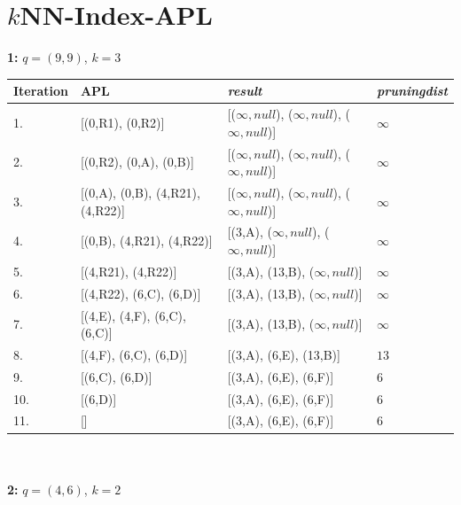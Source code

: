     \section{\(k\)NN-Index-APL}
    \textbf{1:} \(q=(9,9)\), \(k=3\)\\
    \begin{tabular}{l | l | l | l}
        Iteration   & APL               & \textit{result}                                               & \textit{pruningdist} \\
        \toprule
        1.          & [(0,R1), (0,R2)]   & [(\(\infty, null\)), (\(\infty, null\)), (\(\infty, null\))]  & \(\infty\) \\
        2.          & [(0,R2), (0,A), (0,B)] & [(\(\infty, null\)), (\(\infty, null\)), (\(\infty, null\))] & \(\infty\) \\
        3.          & [(0,A), (0,B), (4,R21), (4,R22)] & [(\(\infty, null\)), (\(\infty, null\)), (\(\infty, null\))] & \(\infty\) \\
        4.          & [(0,B), (4,R21), (4,R22)] & [(3,A), (\(\infty, null\)), (\(\infty, null\))] & \(\infty\) \\
        5.          & [(4,R21), (4,R22)] & [(3,A), (13,B), (\(\infty, null\))] & \(\infty\) \\
        6.          & [(4,R22), (6,C), (6,D)] & [(3,A), (13,B), (\(\infty, null\))] & \(\infty\) \\
        7.          & [(4,E), (4,F), (6,C), (6,C)] & [(3,A), (13,B), (\(\infty, null\))] & \(\infty\) \\
        8.          & [(4,F), (6,C), (6,D)] & [(3,A), (6,E), (13,B)] & \(13\) \\
        9.          & [(6,C), (6,D)] & [(3,A), (6,E), (6,F)] & \(6\) \\
        10.         & [(6,D)] & [(3,A), (6,E), (6,F)] & \(6\) \\
        11.         & [] & [(3,A), (6,E), (6,F)] & \(6\) \\

    \end{tabular}
    \\
    \\
    \textbf{2:} \(q=(4,6)\), \(k=2\)\\
